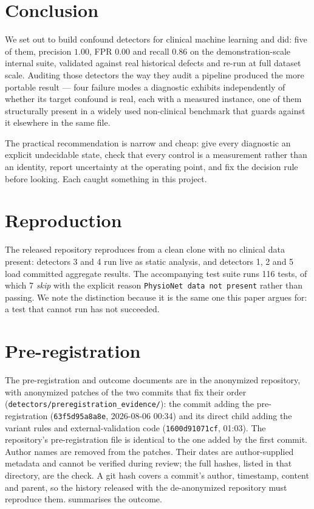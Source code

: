 \documentclass[pmlr,twocolumn,10pt]{jmlr}
\begin{document}
\section{Conclusion}
\label{sec:conclusion}

We set out to build confound detectors for clinical machine learning and did:
five of them, precision $1.00$, FPR $0.00$ and recall $0.86$ on the
demonstration-scale internal suite, validated against real historical defects
and re-run at full dataset scale. Auditing those detectors the way
they audit a pipeline produced the more portable result --- four failure modes a
diagnostic exhibits independently of whether its target confound is real, each
with a measured instance, one of them structurally present in a widely used
non-clinical benchmark that guards against it elsewhere in the same file.

The practical recommendation is narrow and cheap: give every diagnostic an
explicit undecidable state, check that every control is a measurement rather
than an identity, report uncertainty at the operating point, and fix the
decision rule before looking. Each caught something in this project.




\appendix

\section{Reproduction}\label{apd:repro}

The released repository reproduces  from a clean clone with
no clinical data present: detectors 3 and 4 run live as static analysis, and
detectors 1, 2 and 5 load committed aggregate results. The accompanying test
suite runs 116 tests, of which 7 \emph{skip} with the explicit reason
\texttt{PhysioNet data not present} rather than passing. We note the distinction
because it is the same one this paper argues for: a test that cannot run has not
succeeded.

\section{Pre-registration}\label{apd:prereg}

The pre-registration and outcome documents are in the anonymized repository,
with anonymized patches of the two commits that fix their order
(\texttt{detectors/preregistration\_evidence/}): the commit adding the
pre-registration (\texttt{63f5d95a8a8e}, 2026-08-06 00:34) and its direct child
adding the variant rules and external-validation code (\texttt{1600d91071cf},
01:03). The repository's pre-registration file is identical to the one added by
the first commit. Author names are removed from the patches. Their dates are
author-supplied metadata and cannot be verified during review; the full hashes,
listed in that directory, are the check. A git hash covers a commit's author,
timestamp, content and parent, so the history released with the de-anonymized
repository must reproduce them.  summarises the
outcome.
\end{document}
